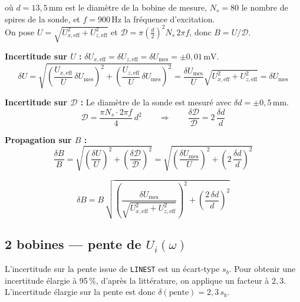 \documentclass[a4paper,10pt]{article}
\begin{document}
où $d = 13{,}5\,\text{mm}$ est le diamètre de la bobine de mesure,
$N_s = 80$ le nombre de spires de la sonde,
et $f = 900\,\text{Hz}$ la fréquence d'excitation.\\
On pose $U = \sqrt{U_{x,\text{eff}}^2 + U_{z,\text{eff}}^2}$ et
$\mathcal{D} = \pi\!\left(\tfrac{d}{2}\right)^2 N_s\,2\pi f$,
donc $B = U / \mathcal{D}$.

\medskip
\textbf{Incertitude sur $U$ :}
$\delta U_{x,\text{eff}} = \delta U_{z,\text{eff}} = \delta U_\text{mes} = \pm 0{,}01\,\text{mV}$.
\begin{equation}
  \delta U
  = \sqrt{\left(\frac{U_{x,\text{eff}}}{U}\,\delta U_\text{mes}\right)^2
          + \left(\frac{U_{z,\text{eff}}}{U}\,\delta U_\text{mes}\right)^2}
  = \frac{\delta U_\text{mes}}{U}
    \sqrt{U_{x,\text{eff}}^2 + U_{z,\text{eff}}^2}
  = \delta U_\text{mes}
  \label{eq:dU}
\end{equation}

\textbf{Incertitude sur $\mathcal{D}$ :}
Le diamètre de la sonde est mesuré avec $\delta d = \pm 0{,}5\,\text{mm}$.
\begin{equation}
  \mathcal{D} = \frac{\pi N_s \cdot 2\pi f}{4}\,d^2
  \qquad\Rightarrow\qquad
  \frac{\delta \mathcal{D}}{\mathcal{D}} = 2\,\frac{\delta d}{d}
\end{equation}

\textbf{Propagation sur $B$ :}
\begin{equation}
  \frac{\delta B}{B}
  = \sqrt{\left(\frac{\delta U}{U}\right)^2 + \left(\frac{\delta \mathcal{D}}{\mathcal{D}}\right)^2}
  = \sqrt{\left(\frac{\delta U_\text{mes}}{U}\right)^2 + \left(2\,\frac{\delta d}{d}\right)^2}
  \label{eq:dB_rel}
\end{equation}

\begin{equation}
  \boxed{
  \delta B
  = B\,\sqrt{\left(\frac{\delta U_\text{mes}}{\sqrt{U_{x,\text{eff}}^2+U_{z,\text{eff}}^2}}\right)^{\!2}
             + \left(\frac{2\,\delta d}{d}\right)^{\!2}}
  }
\end{equation}

\pagebreak

\subsection{2 bobines --- pente de \texorpdfstring{$U_i(\omega)$}{Ui(omega)}}

L'incertitude sur la pente issue de \texttt{LINEST} est un écart-type $s_b$.
Pour obtenir une incertitude élargie à 95\,\%, d'après la littérature,
on applique un facteur à $2{,}3$.\\
L'incertitude élargie sur la pente est donc $\delta(\text{pente}) = 2{,}3\,s_b$.
\end{document}

